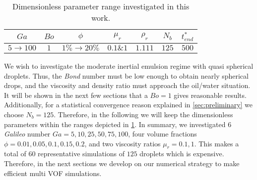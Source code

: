 \begin{table}[h!]
    \centering
    \caption{Dimensionless parameter range investigated in this work.}
    \begin{tabular}{ccccccc}\hline
        $Ga$&$Bo$&$\phi$&$\mu_r$&$\rho_r$&$N_b$&$t^*_{end}$\\ \hline\hline
        $5\rightarrow 100$&$1$&$1\% \rightarrow 20\%$&$0.1 \& 1$&$1.111$&$125$&$500$\\ \hline
    \end{tabular}
    \label{tab:parameters}
\end{table}
We wish to investigate the moderate inertial emulsion regime with quasi spherical droplets. 
Thus, the \textit{Bond} number must be low enough to obtain nearly spherical drops, and the viscosity and density ratio must approach the oil/water situation. 
It will be shown in the next few sections that a $Bo =1$ gives reasonable results. 
Additionally, for a statistical convergence reason explained in \ref{sec:preliminary} we choose $N_b = 125$. 
Therefore, in the following we will keep the dimensionless parameters within the ranges depicted in \ref{tab:parameters}.
In summary, we investigated $6$ \textit{Galileo} number $Ga = 5,10,25,50,75,100$, four volume fractions $\phi = 0.01,0.05,0.1,0.15,0.2$, and two viscosity ratios $\mu_r =0.1,1$. 
This makes a total of $60$ representative simulations of $125$ droplets which is expensive. 
Therefore, in the next sections we develop on our numerical strategy to make efficient multi VOF simulations. 





